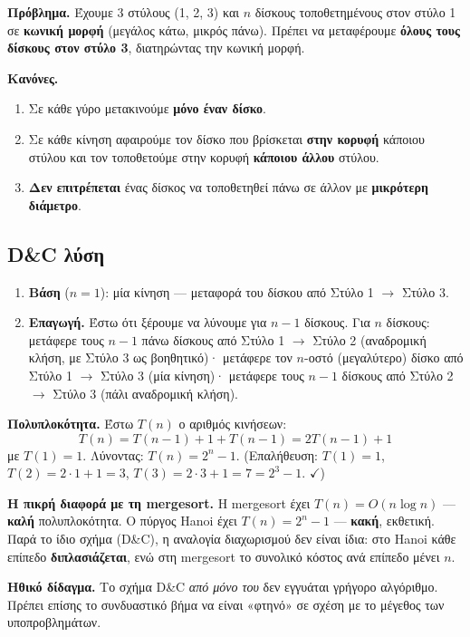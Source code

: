 \documentclass[11pt,a4paper]{article}
\begin{document}
\begin{examplebox}
\textbf{Πρόβλημα.} Έχουμε 3 στύλους (1, 2, 3) και $n$ δίσκους τοποθετημένους στον
στύλο 1 σε \textbf{κωνική μορφή} (μεγάλος κάτω, μικρός πάνω). Πρέπει να
μεταφέρουμε \textbf{όλους τους δίσκους στον στύλο 3}, διατηρώντας την κωνική
μορφή.

\textbf{Κανόνες.}
\begin{enumerate}
  \item Σε κάθε γύρο μετακινούμε \textbf{μόνο έναν δίσκο}.
  \item Σε κάθε κίνηση αφαιρούμε τον δίσκο που βρίσκεται \textbf{στην κορυφή}
  κάποιου στύλου και τον τοποθετούμε στην κορυφή \textbf{κάποιου άλλου} στύλου.
  \item \textbf{Δεν επιτρέπεται} ένας δίσκος να τοποθετηθεί πάνω σε άλλον με
  \textbf{μικρότερη διάμετρο}.
\end{enumerate}
\end{examplebox}

\subsection{D\&C λύση}

\begin{enumerate}
  \item \textbf{Βάση} ($n = 1$): μία κίνηση --- μεταφορά του δίσκου από Στύλο 1
  $\to$ Στύλο 3.
  \item \textbf{Επαγωγή.} Έστω ότι ξέρουμε να λύνουμε για $n-1$ δίσκους. Για $n$
  δίσκους: μετάφερε τους $n-1$ πάνω δίσκους από Στύλο 1 $\to$ Στύλο 2 (αναδρομική
  κλήση, με Στύλο 3 ως βοηθητικό)· μετάφερε τον $n$-οστό (μεγαλύτερο) δίσκο από
  Στύλο 1 $\to$ Στύλο 3 (μία κίνηση)· μετάφερε τους $n-1$ δίσκους από Στύλο 2
  $\to$ Στύλο 3 (πάλι αναδρομική κλήση).
\end{enumerate}

\textbf{Πολυπλοκότητα.} Έστω $T(n)$ ο αριθμός κινήσεων:
\[
T(n) = T(n-1) + 1 + T(n-1) = 2 T(n-1) + 1
\]
με $T(1) = 1$. Λύνοντας: $T(n) = 2^n - 1$. (Επαλήθευση: $T(1) = 1$,
$T(2) = 2 \cdot 1 + 1 = 3$, $T(3) = 2 \cdot 3 + 1 = 7 = 2^3 - 1$. $\checkmark$)

\begin{warningbox}
\textbf{Η πικρή διαφορά με τη mergesort.} Η mergesort έχει $T(n) = O(n \log n)$
--- \textbf{καλή} πολυπλοκότητα. Ο πύργος Hanoi έχει $T(n) = 2^n - 1$ ---
\textbf{κακή}, εκθετική. Παρά το ίδιο σχήμα (D\&C), η αναλογία διαχωρισμού δεν
είναι ίδια: στο Hanoi κάθε επίπεδο \textbf{διπλασιάζεται}, ενώ στη mergesort το
συνολικό κόστος ανά επίπεδο μένει $n$.

\textbf{Ηθικό δίδαγμα.} Το σχήμα D\&C \textit{από μόνο του} δεν εγγυάται γρήγορο
αλγόριθμο. Πρέπει επίσης το συνδυαστικό βήμα να είναι «φτηνό» σε σχέση με το
μέγεθος των υποπροβλημάτων.
\end{warningbox}
\end{document}
